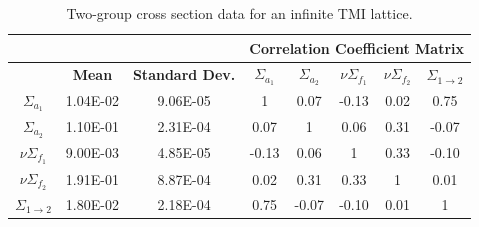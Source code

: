 \begin{table}[!htb]
\caption[TMI infinite lattice two-group cross sections.]{\label{table:infintie_lattice_tmi_data} 
Two-group cross section data for an infinite TMI lattice.}
\centering
\begin{tabular}{||c||c|c|c|c|c|c|c||} 
\hline \hline
  &  &  & \multicolumn{5}{|c||}{\textbf{Correlation Coefficient Matrix}}  \\ \hline
  & \textbf{Mean} & \textbf{Standard Dev.} & $\Sigma_{a_1}$ & $\Sigma_{a_2}$ & 
  $\nu\Sigma_{f_1}$ & $\nu\Sigma_{f_2}$ & $\Sigma_{1\rightarrow 2}$ \\ \hline \hline
$\Sigma_{a_1}$ & 1.04E-02 & 9.06E-05 & 1 & 0.07 & -0.13 & 0.02 & 0.75 \\ \hline
$\Sigma_{a_2}$ & 1.10E-01 & 2.31E-04 & 0.07  &  1     & 0.06  & 0.31 & -0.07 \\ \hline
$\nu\Sigma_{f_1}$ & 9.00E-03 & 4.85E-05 & -0.13 &  0.06  & 1     & 0.33 & -0.10 \\ \hline
$\nu\Sigma_{f_2}$ & 1.91E-01 & 8.87E-04 & 0.02  &  0.31  & 0.33  & 1    & 0.01 \\ \hline
$\Sigma_{1\rightarrow 2}$ & 1.80E-02 & 2.18E-04 & 0.75  &  -0.07 & -0.10 & 0.01 & 1 \\ \hline \hline
\end{tabular}
\end{table}

